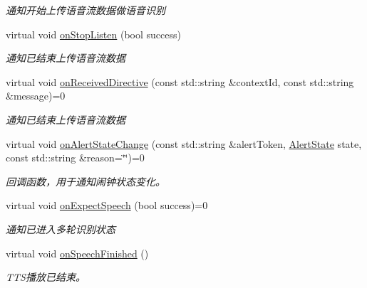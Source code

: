 \begin{DoxyCompactItemize}
\begin{DoxyCompactList}\small\item\em 通知开始上传语音流数据做语音识别 \end{DoxyCompactList}\item 
virtual void \hyperlink{classduerOSDcsSDK_1_1sdkInterfaces_1_1DialogUXStateObserverInterface_a4449d08c2a37dab840892f81e4aef8b2}{on\+Stop\+Listen} (bool success)
\begin{DoxyCompactList}\small\item\em 通知已结束上传语音流数据 \end{DoxyCompactList}\item 
virtual void \hyperlink{classduerOSDcsSDK_1_1sdkInterfaces_1_1DialogUXStateObserverInterface_a1d2558050e701fd223c5f71d41e6042a}{on\+Received\+Directive} (const std\+::string \&context\+Id, const std\+::string \&message)=0
\begin{DoxyCompactList}\small\item\em 通知已结束上传语音流数据 \end{DoxyCompactList}\item 
virtual void \hyperlink{classduerOSDcsSDK_1_1sdkInterfaces_1_1DialogUXStateObserverInterface_aad6473c61fe192e97afa9a2b79aad7cc}{on\+Alert\+State\+Change} (const std\+::string \&alert\+Token, \hyperlink{classduerOSDcsSDK_1_1sdkInterfaces_1_1DialogUXStateObserverInterface_ac45d1c6a17f061837ace6a4aeff9cc46}{Alert\+State} state, const std\+::string \&reason=\char`\"{}\char`\"{})=0
\begin{DoxyCompactList}\small\item\em 回调函数，用于通知闹钟状态变化。 \end{DoxyCompactList}\item 
virtual void \hyperlink{classduerOSDcsSDK_1_1sdkInterfaces_1_1DialogUXStateObserverInterface_ad64bcd73399ce997208ff0eb438b9ca7}{on\+Expect\+Speech} (bool success)=0
\begin{DoxyCompactList}\small\item\em 通知已进入多轮识别状态 \end{DoxyCompactList}\item 
\mbox{\label{classduerOSDcsSDK_1_1sdkInterfaces_1_1DialogUXStateObserverInterface_ac705edbf0fe9a07e4f72ecd4c911e779}} 
virtual void \hyperlink{classduerOSDcsSDK_1_1sdkInterfaces_1_1DialogUXStateObserverInterface_ac705edbf0fe9a07e4f72ecd4c911e779}{on\+Speech\+Finished} ()
\begin{DoxyCompactList}\small\item\em T\+T\+S播放已结束。 \end{DoxyCompactList}\end{DoxyCompactItemize}
